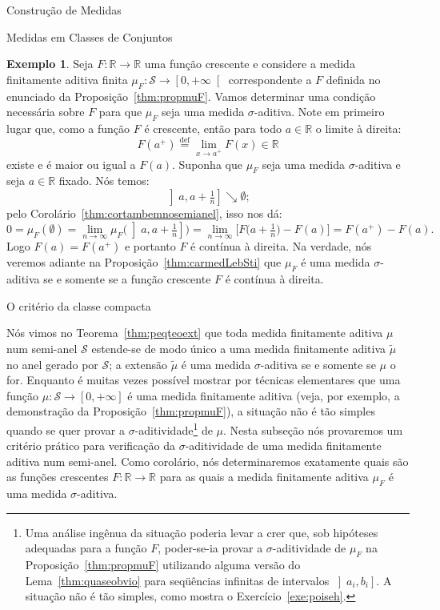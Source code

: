 \documentclass[oneside,final,11pt]{amsbook}
\newcommand{\R}{\mathds R}
\theoremstyle{remark}\newtheorem{exercise}{Exercício}[chapter]
\theoremstyle{remark}\newtheorem{*exercise}[exercise]{\hbox to 0pt{\hskip 0pt minus 1fil*}Exercício}
\theoremstyle{definition}\newtheorem{exdefin}{Definição}[chapter]
\theoremstyle{plain}\newtheorem{teo}{Teorema}[section]
\theoremstyle{plain}\newtheorem{lem}[teo]{Lema}
\theoremstyle{plain}\newtheorem{prop}[teo]{Proposição}
\theoremstyle{plain}\newtheorem{cor}[teo]{Corolário}
\theoremstyle{definition}\newtheorem{defin}[teo]{Definição}
\theoremstyle{remark}\newtheorem{rem}[teo]{Observação}
\theoremstyle{definition}\newtheorem{notation}[teo]{Notação}
\theoremstyle{definition}\newtheorem{convention}[teo]{Convenção}
\theoremstyle{definition}\newtheorem{example}[teo]{Exemplo}
\numberwithin{section}{chapter}
\numberwithin{equation}{section}
\begin{document}
\begin{chapter}{Construção de Medidas}
\begin{section}{Medidas em Classes de Conjuntos}
\begin{example}\label{exa:muFsigmaimplFcontdir}
Seja $F:\R\to\R$ uma função crescente e considere a medida finitamente aditiva
finita $\mu_F:\mathcal S\to\left[0,+\infty\right[$ correspondente a $F$ definida
no enunciado da Proposição~\ref{thm:propmuF}. Vamos determinar uma condição
necessária sobre $F$ para que $\mu_F$ seja uma medida $\sigma$-aditiva.
Note em primeiro lugar que, como a função $F$ é crescente, então para todo $a\in\R$
o limite à direita:%
\[F(a^+)\stackrel{\text{def}}=\lim_{x\to a^+}F(x)\in\R\]
existe e é maior ou igual a $F(a)$.
Suponha que $\mu_F$ seja uma medida $\sigma$-aditiva e seja $a\in\R$ fixado.
Nós temos:
\[\left]a,a+\tfrac1n\right]\searrow\emptyset;\]
pelo Corolário~\ref{thm:cortambemnosemianel}, isso nos dá:
\[0=\mu_F(\emptyset)=\lim_{n\to\infty}\mu_F\big(\left]a,a+\tfrac1n\right]\!\big)
=\lim_{n\to\infty}\big[F\big(a+\tfrac1n\big)-F(a)\big]=F(a^+)-F(a).\]
Logo $F(a)=F(a^+)$ e portanto $F$ é contínua à direita. Na verdade, nós veremos
adiante na Proposição~\ref{thm:carmedLebSti} que $\mu_F$ é uma medida $\sigma$-aditiva se e somente
se a função crescente $F$ é contínua à direita.
\end{example}

\begin{subsection}{O critério da classe compacta}

Nós vimos no Teorema~\ref{thm:peqteoext} que toda medida finitamente aditiva $\mu$
num semi-anel $\mathcal S$ estende-se de modo único a uma medida finitamente aditiva $\tilde\mu$
no anel gerado por $\mathcal S$; a extensão $\tilde\mu$ é uma medida $\sigma$-aditiva se e
somente se $\mu$ o for. Enquanto é muitas vezes possível mostrar por técnicas
elementares que uma função $\mu:\mathcal S\to[0,+\infty]$ é uma medida finitamente
aditiva (veja, por exemplo, a demonstração da Proposição~\ref{thm:propmuF}), a situação
não é tão simples quando se quer provar a $\sigma$-aditividade\footnote{%
Uma análise ingênua da situação poderia levar a crer que, sob hipóteses adequadas para a função $F$,
poder-se-ia provar a $\sigma$-aditividade de $\mu_F$ na Proposição~\ref{thm:propmuF}
utilizando alguma versão do Lema~\ref{thm:quaseobvio} para seqüências infinitas de intervalos
$\left]a_i,b_i\right]$. A situação não é tão simples, como mostra o Exercício~\ref{exe:poiseh}.}
de $\mu$. Nesta subseção nós provaremos um critério prático para verificação da $\sigma$-aditividade
de uma medida finitamente aditiva num semi-anel. Como corolário, nós determinaremos exatamente
quais são as funções crescentes $F:\R\to\R$ para as quais a medida finitamente aditiva $\mu_F$
é uma medida $\sigma$-aditiva.


\end{subsection}
\end{section}
\end{chapter}
\end{document}
